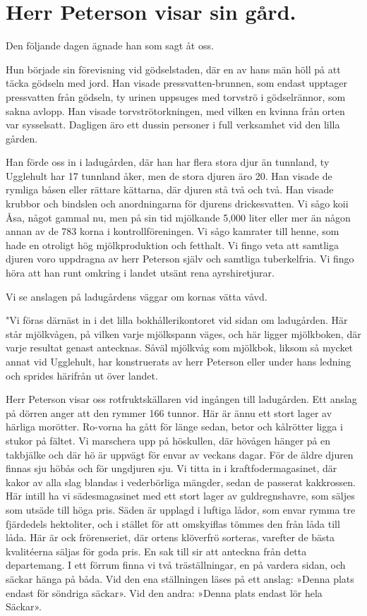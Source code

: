 \chapter{Herr Peterson visar sin gård.}

Den följande dagen ägnade han som sagt åt oss.

Hun började sin förevisning vid gödselstaden, där en av hans
män höll på att täcka gödseln med jord. Han visade
pressvatten-brunnen, som endast upptager pressvatten från gödseln, ty urinen
uppsuges med
torvströ i gödselrännor,
som sakna avlopp.
Han visade
torvströtorkningen, med
vilken en kvinna från
orten var sysselsatt.
Dagligen äro ett
dussin personer i full
verksamhet vid den
lilla gården.

Han förde oss
in i ladugården, där
han har flera stora
djur än tunnland, ty
Ugglehult har 17
tunnland åker, men
de stora djuren äro
20. Han visade de
rymliga båsen eller
rättare kättarna, där
djuren stå två och
två. Han visade
krubbor och bindslen
och anordningarna för djurens drickesvatten. Vi sågo koii Åsa,
något gammal nu, men på sin tid mjölkande 5,000 liter eller
mer än någon annan av de 783 korna i kontrollföreningen. Vi
sågo kamrater till henne, som hade en otroligt hög mjölkproduktion och fetthalt. Vi fingo veta att samtliga djuren voro
uppdragna av herr Peterson själv och samtliga tuberkelfria. Vi fingo
höra att han runt omkring i landet utsänt rena ayrshiretjurar.

Vi se anslagen på ladugårdens väggar om kornas vätta våvd.

"Vi föras därnäst in i det lilla bokhållerikontoret vid sidan om
ladugården. Här står mjölkvågen, på vilken varje mjölkspann
väges, och här ligger mjölkboken, där varje resultat genast
antecknas. Såväl mjölkvåg som mjölkbok, liksom så mycket annat
vid Ugglehult, har konstruerats av herr Peterson eller under hans
ledning och sprides härifrån ut över landet.

Herr Peterson visar oss rotfruktskällaren vid ingången till
ladugården. Ett anslag på dörren anger att den rymmer 166
tunnor. Här är ännu ett stort lager av härliga morötter.
Ro-vorna ha gått för länge sedan, betor och kålrötter ligga i stukor
på fältet. Vi marschera upp på höskullen, där hövågen hänger
på en takbjälke och där hö är uppvägt för envar av veckans
dagar. För de äldre djuren finnas sju höbås och för ungdjuren
sju. Vi titta in i kraftfodermagasinet, där kakor av alla slag
blandas i vederbörliga mängder, sedan de passerat kakkrossen. Här
intill ha vi sädesmagasinet med ett stort lager av guldregnshavre,
som säljes som utsäde till höga pris. Säden är upplagd i luftiga
lådor, som envar rymma tre fjärdedels hektoliter, och i stället
för att omskyiflas tömmes den från låda till låda. Här är ock
frörenseriet, där ortens klöverfrö sorteras, varefter de bästa
kvalitéerna säljas för goda pris. En sak till sir att
anteckna från detta departemang. I ett förrum finna vi två
träställningar, en på vardera sidan, och säckar hänga på båda. Vid
den ena ställningen läses på ett anslag: »Denna plats endast för
söndriga säckar». Vid den andra: »Denna plats endast lör hela
Säckar».

